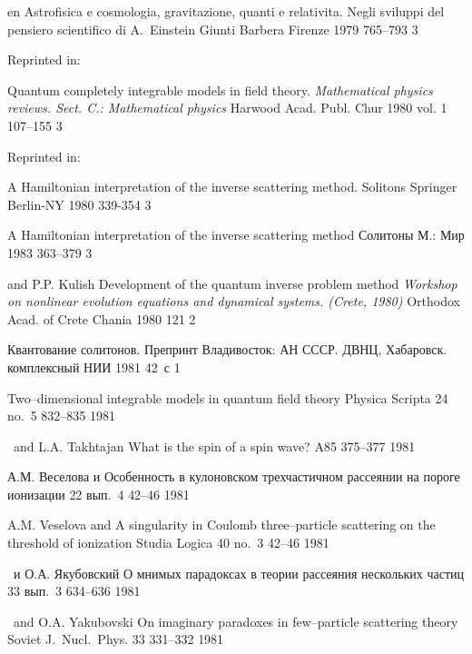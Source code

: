 {en} 
{Astrofisica e cosmologia, gravitazione, quanti e
relativita. Negli sviluppi del pensiero scientifico di A.~Einstein}
{Giunti Barbera} {Firenze} {1979} {} {765--793} {3}

Reprinted in: 

{\LF}
{Quantum completely integrable models in field theory.}
{\em Mathematical physics reviews. Sect. C.: Mathematical physics}
{Harwood Acad. Publ.} {Chur} {1980} {vol. 1} {107--155} {3}

Reprinted in: 

{\LF}
{A Hamiltonian interpretation of the inverse scattering method.} 
{Solitons} {Springer} {Berlin-NY} {1980} {339-354} {3}

{\LD} {A Hamiltonian interpretation of the inverse scattering method}
{Солитоны} {М.: Мир} {} {1983} {} {363--379} {3} 

{\LF and P.P. Kulish}
{Development of the quantum inverse problem method}
{\em Workshop on nonlinear evolution equations and
 dynamical systems. (Crete, 1980)} {Orthodox Acad. of Crete}
{Chania} {1980} {} {121} {2}

{\LD}
{Квантование солитонов.} 
{Препринт} {Владивосток: АН СССР. ДВНЦ, Хабаровск. комплексный НИИ}
{} {1981} {} {42~с} {1}

{\LF}
{Two--dimensional integrable models in quantum field theory}
{Physica Scripta} {24} {no.~5} {832--835} {1981}

{\LF\ and L.A. Takhtajan}
{What is the spin of a spin wave?}
{\PL} {A85} {} {375--377} {1981}

{А.М. Веселова и \LD}
{Особенность в кулоновском трехчастичном рассеянии на пороге ионизации}
{\VestnikF} {22} {вып.~4} {42--46} {1981}

{A.M. Veselova and \LF}
{A singularity in Coulomb three--particle
scattering on the threshold of ionization}
{Studia Logica} {40} {no.~3} {42--46} {1981}

{\LD\ и О.А. Якубовский}
{О мнимых парадоксах в теории рассеяния нескольких частиц}
{\YF} {33} {вып.~3} {634--636} {1981}

{\LF\ and O.A. Yakubovski}
{On imaginary paradoxes in few--particle scattering theory}
{Soviet J.\ Nucl.\ Phys.} {33} {331--332} {1981}

